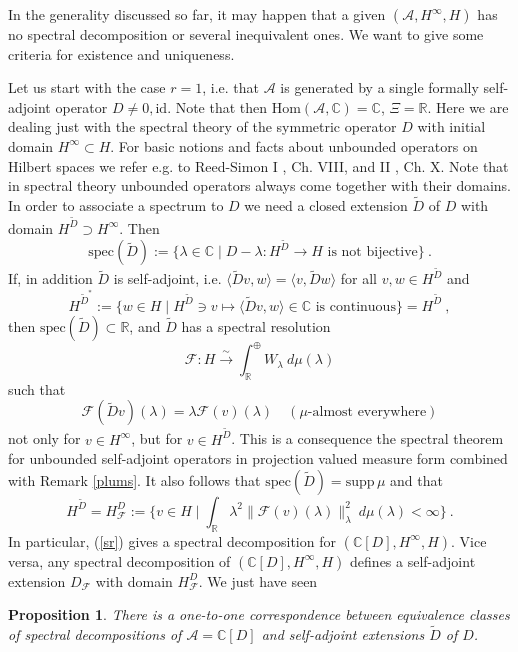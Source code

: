 \documentclass[10]{amsart}
\newtheorem{pro}[thm]{Proposition}
\theoremstyle{remark}
\theoremstyle{definition}
\numberwithin{equation}{section}
\newcommand{\R}{\mathbb{R}}           %
\newcommand{\C}{\mathbb{C}}           %
\newcommand{\Hom}{\mathrm{Hom}}
\newcommand{\id}{\mathrm{id}}
\newcommand{\supp}{\mathrm{supp}}
\newcommand{\spec}{{\mathrm{spec}}}
\newcommand{\Cal}{\mathcal}
\newcommand{\be}{\begin{equation}}
\newcommand{\defn}{{:=}}
\begin{document}
{In the generality discussed so far, it may happen that a given $(\Cal A, H^\infty, H)$ has no spectral decomposition or several inequivalent ones. We want to give
some criteria for existence and uniqueness. 

Let us start with the case $r=1$, i.e. that $\Cal A$ is generated by a single formally self-adjoint operator $D\ne 0,\id$.
Note that then $\Hom(\Cal A, \C)=\C$, $\Xi=\R$. Here we are dealing just with the spectral theory of the symmetric operator $D$ with initial domain $H^\infty\subset H$.
For basic notions and facts about unbounded operators on Hilbert spaces we refer e.g. to Reed-Simon I \cite{RSI}, Ch. VIII, and II \cite{RSII}, Ch. X.
Note that in spectral theory unbounded operators always come together with their domains. In order to associate a spectrum to $D$ we need a closed extension
$\tilde D$ of $D$ with domain $H^{\tilde D}\supset H^\infty$. Then
$$ \spec(\tilde D)\defn\{\lambda\in\C\mid D-\lambda : H^{\tilde D}\rightarrow H\mbox{ is not bijective}\}\ .$$
If, in addition $\tilde D$ is self-adjoint, i.e. $  \langle \tilde Dv,w\rangle= \langle  v,\tilde Dw\rangle$ for all $v,w\in  H^{\tilde D}$ and
$$ H^{\tilde D^*}\defn \{w\in H\mid H^{\tilde D}\ni v\mapsto \langle \tilde Dv,w\rangle\in \C\mbox{ is continuous}\}=H^{\tilde D}\ ,$$
then $\spec(\tilde D)\subset\R$, and $\tilde D$ has a spectral resolution
\be\label{sr}\Cal F: H\stackrel{\sim}{\longrightarrow} \int_\R^\oplus W_\lambda\:d\mu(\lambda)
\end{equation}
such that
$$\Cal F(\tilde Dv)(\lambda)=\lambda \Cal F(v)(\lambda)  \quad(\mu\mbox{-almost everywhere}) $$
not only for $v\in H^\infty$, but for $v\in H^{\tilde D}$. This is a consequence the spectral theorem for unbounded self-adjoint operators in  projection valued measure form combined with Remark \ref{plums}.
It also follows that $\spec(\tilde D)=\supp\, \mu$ and that
$$ H^{\tilde D}=H_{\Cal F}^D\defn \{v\in H\mid \int_\R \lambda^2 \|\Cal F(v)(\lambda)\|_\lambda^2\: d\mu(\lambda)<\infty\}\ .$$
In particular, (\ref{sr}) gives a spectral decomposition for $(\C[D], H^\infty, H)$. Vice versa, any spectral decomposition of  $(\C[D], H^\infty, H)$ defines
a self-adjoint extension $D_\Cal F$ with domain  $H_{\Cal F}^D$. We just have seen

\begin{pro}\label{stark} There is a one-to-one correspondence between equivalence classes of spectral decompositions of $\Cal A=\C[D]$ and self-adjoint extensions $\tilde D$ of $D$.
\end{pro}

}
\end{document}
